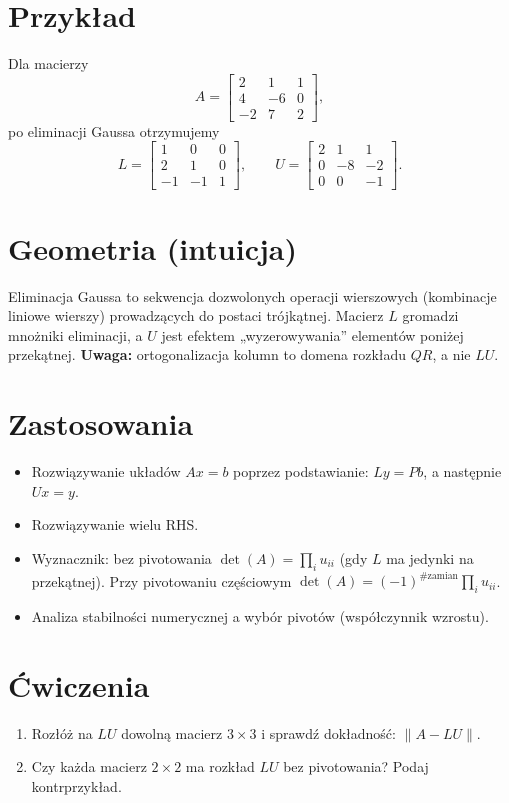 \documentclass[12pt]{article}
\begin{document}
\section*{Przykład}
Dla macierzy
\[
A = \begin{bmatrix}
2 & 1 & 1 \\
4 & -6 & 0 \\
-2 & 7 & 2
\end{bmatrix},
\]
po eliminacji Gaussa otrzymujemy
\[
L = \begin{bmatrix}
1 & 0 & 0 \\
2 & 1 & 0 \\
-1 & -1 & 1
\end{bmatrix}, \qquad
U = \begin{bmatrix}
2 & 1 & 1 \\
0 & -8 & -2 \\
0 & 0 & -1
\end{bmatrix}.
\]

\section*{Geometria (intuicja)}
Eliminacja Gaussa to sekwencja dozwolonych operacji wierszowych (kombinacje liniowe wierszy)
prowadzących do postaci trójkątnej. Macierz $L$ gromadzi mnożniki eliminacji, a $U$ jest efektem
„wyzerowywania” elementów poniżej przekątnej. \textbf{Uwaga:} ortogonalizacja kolumn to domena rozkładu $QR$,
a nie $LU$.

\section*{Zastosowania}
\begin{itemize}[label=$\star$]
\item Rozwiązywanie układów $Ax = b$ poprzez podstawianie: $Ly = P b$, a następnie $Ux = y$.
\item  Rozwiązywanie wielu RHS.
\item Wyznacznik: bez pivotowania $\det(A)=\prod_i u_{ii}$ (gdy $L$ ma jedynki na przekątnej).
Przy pivotowaniu częściowym $\det(A)=(-1)^{\#\text{zamian}} \prod_i u_{ii}$.
\item Analiza stabilności numerycznej a wybór pivotów (współczynnik wzrostu).

\end{itemize}

\section*{Ćwiczenia}
\begin{enumerate}
\item Rozłóż na $LU$ dowolną macierz $3 \times 3$ i sprawdź dokładność: $\|A-LU\|$.
\item Czy każda macierz $2 \times 2$ ma rozkład $LU$ bez pivotowania? Podaj kontrprzykład.

\end{enumerate}
\end{document}
